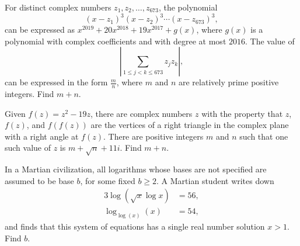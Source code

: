 \begin{question}[name={2019 AIME I, \href{https://artofproblemsolving.com/community/c4p11972643}{Problem 10}}]
	For distinct complex numbers $z_1,z_2,\dots,z_{673}$, the polynomial
	\[ (x-z_1)^3(x-z_2)^3 \cdots (x-z_{673})^3, \]can be expressed as $x^{2019} + 20x^{2018} + 19x^{2017}+g(x)$, where $g(x)$ is a polynomial with complex coefficients and with degree at most $2016$. The value of
	\[ \left| \sum_{1 \le j <k \le 673} z_jz_k \right|, \]can be expressed in the form $\tfrac{m}{n}$, where $m$ and $n$ are relatively prime positive integers. Find $m+n$.
\end{question}


%	












\begin{question}[name={2019 AIME I, \href{https://artofproblemsolving.com/community/c4p11972694}{Problem 12}}]
	Given $f(z) = z^2-19z$, there are complex numbers $z$ with the property that $z$, $f(z)$, and $f(f(z))$ are the vertices of a right triangle in the complex plane with a right angle at $f(z)$. There are positive integers $m$ and $n$ such that one such value of $z$ is $m+\sqrt{n}+11i$. Find $m+n$.
\end{question}


%	











\begin{question}[name={2019 AIME II, \href{https://artofproblemsolving.com/community/c4p12030324}{Problem 6}}]
	In a Martian civilization, all logarithms whose bases are not specified are assumed to be base $b$, for some fixed $b \geq 2$. A Martian student writes down
	\begin{align*}
		3 \log(\sqrt{x}\log x) &= 56,\\
		\log_{\log (x)}(x) &= 54,
	\end{align*}
	and finds that this system of equations has a single real number solution $x > 1$. Find $b$.
\end{question}


